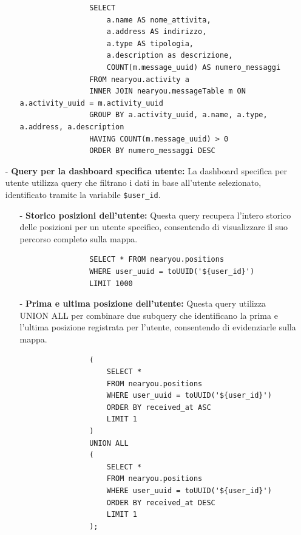 \documentclass[10pt]{article}
\begin{document}
\begin{itemize}
\begin{itemize}
                \begin{lstlisting}
                SELECT 
                    a.name AS nome_attivita,
                    a.address AS indirizzo,
                    a.type AS tipologia,
                    a.description as descrizione, 
                    COUNT(m.message_uuid) AS numero_messaggi
                FROM nearyou.activity a
                INNER JOIN nearyou.messageTable m ON a.activity_uuid = m.activity_uuid
                GROUP BY a.activity_uuid, a.name, a.type, a.address, a.description
                HAVING COUNT(m.message_uuid) > 0
                ORDER BY numero_messaggi DESC
                \end{lstlisting}
            \end{itemize}

        \item[-] \textbf{Query per la dashboard specifica utente:} 
        La dashboard specifica per utente utilizza query che filtrano i dati in base all'utente selezionato, identificato tramite la variabile \texttt{\${user\_id}}.

            \begin{itemize}
                \item[-] \textbf{Storico posizioni dell'utente:}
                Questa query recupera l'intero storico delle posizioni per un utente specifico, consentendo di visualizzare il suo percorso completo sulla mappa.
                
                \begin{lstlisting}
                SELECT * FROM nearyou.positions 
                WHERE user_uuid = toUUID('${user_id}') 
                LIMIT 1000
                \end{lstlisting}
                
                \item[-] \textbf{Prima e ultima posizione dell'utente:}
                Questa query utilizza UNION ALL per combinare due subquery che identificano la prima e l'ultima posizione registrata per l'utente, consentendo di evidenziarle sulla mappa.
                
                \begin{lstlisting}
                (
                    SELECT * 
                    FROM nearyou.positions 
                    WHERE user_uuid = toUUID('${user_id}') 
                    ORDER BY received_at ASC 
                    LIMIT 1
                )
                UNION ALL
                (
                    SELECT * 
                    FROM nearyou.positions 
                    WHERE user_uuid = toUUID('${user_id}') 
                    ORDER BY received_at DESC 
                    LIMIT 1
                );
                \end{lstlisting}
                

\end{itemize}
\end{itemize}
\end{document}
